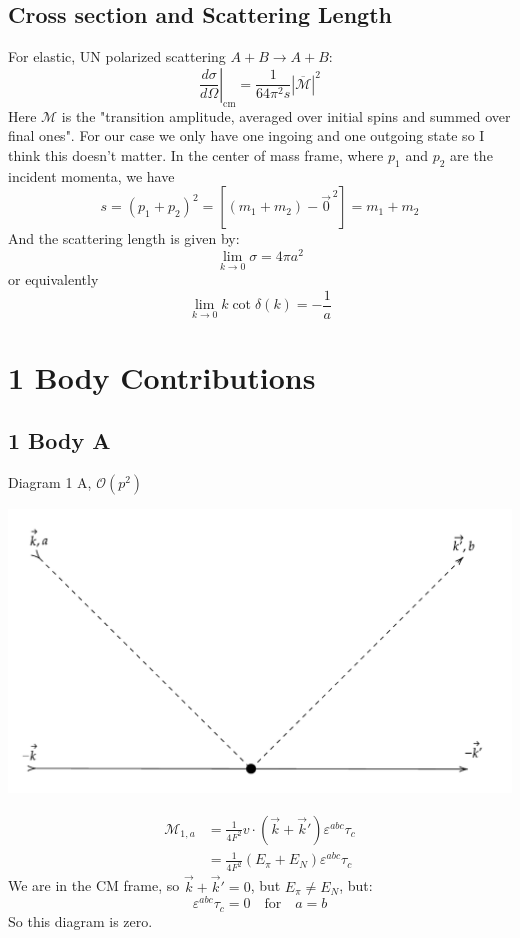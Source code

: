 \documentclass[11pt]{article}
\newcommand\mo{\mathcal{O}}
\newcommand\mm{\mathcal{M}}
\newcommand{\sq}{^{\,2}}
\begin{document}
\subsection{Cross section and Scattering Length}
For elastic, UN polarized scattering $A+B \to A+B$:
\begin{equation}
    \left.\frac{d \sigma}{d \Omega} \right|_{\mathrm{cm}} = \frac{1}{64 \pi^2 s} \left| \overline{\mathcal{M}}\right|^2
\end{equation}
Here $\mathcal{M}$ is the "transition amplitude, averaged over initial spins and summed over final ones". For our case we only have one ingoing and one outgoing state so I think this doesn't matter. In the center of mass frame, where $p_1$ and $p_2$ are the incident momenta, we have
\begin{equation}
    s=(p_1+p_2)^2 =\left[ (m_1+m_2) -\vec{0}\sq\right]= m_1+m_2
\end{equation}
And the scattering length is given by:
\begin{equation}
    \lim_{k\to0} \sigma=4\pi a^2
\end{equation}
or equivalently
\begin{equation}
    \lim_{k\to0} k \cot \delta(k) =-\frac{1}{a} 
\end{equation}
\section{1 Body Contributions}
\subsection{1 Body A}
Diagram 1 A, $\mo(p^2)$
\begin{center}
    \includegraphics[scale=0.65]{1a.pdf}
\end{center}
\begin{align}
    \mm_{1,a}&= \frac{1}{4 F^2} v \cdot \left( \vec{k} +\vec{k}' \right) \varepsilon^{abc} \tau_c\\
             &= \frac{1}{4 F^2} (E_\pi+E_N)\varepsilon^{abc} \tau_c
\end{align}
We are in the CM frame, so $\vec{k}+\vec{k}'=0$, but $E_\pi\neq E_N$, but:
\begin{equation}
    \varepsilon^{abc} \tau_c= 0 \quad \text{for}\quad a=b   
\end{equation}
So this diagram is zero.
\newpage
\end{document}
